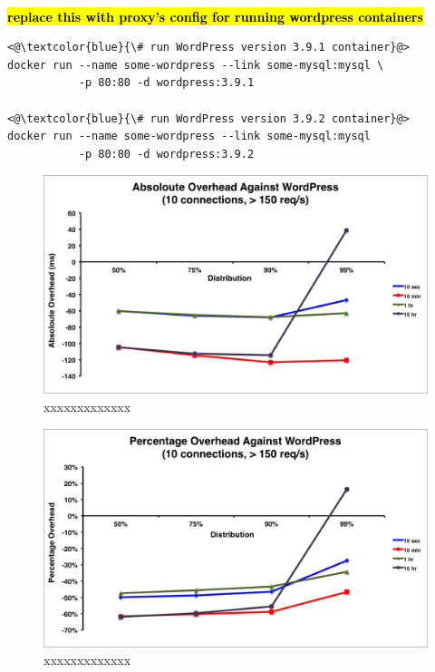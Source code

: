 \documentclass[a4paper,11pt,twoside]{report}
\begin{document}
\noindent\\
\hl{\textbf{replace this with proxy's config for running wordpress containers}}
\begin{lstlisting}[language=terminal]
<@\textcolor{blue}{\# run WordPress version 3.9.1 container}@>
docker run --name some-wordpress --link some-mysql:mysql \
           -p 80:80 -d wordpress:3.9.1

<@\textcolor{blue}{\# run WordPress version 3.9.2 container}@>
docker run --name some-wordpress --link some-mysql:mysql 
           -p 80:80 -d wordpress:3.9.2
\end{lstlisting}

\begin{figure}[!ht]
  \centering
     \includegraphics[scale=0.55]{absoloute-wordpress}
  \caption{xxxxxxxxxxxxx}
  \label{absoloute-wordpress}
\end{figure} 

\begin{figure}[!ht]
  \centering
     \includegraphics[scale=0.55]{percentage-wordpress}
  \caption{xxxxxxxxxxxxx}
  \label{percentage-wordpress}
\end{figure} 
\end{document}
